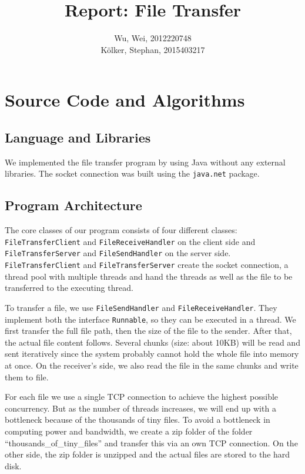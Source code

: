 \documentclass[12pt,a4paper]{article}
\title{Report: File Transfer}
\author{Wu, Wei, 2012220748 \\ Kölker, Stephan, 2015403217}
\begin{document}
\maketitle

\section{Source Code and Algorithms}

\subsection{Language and Libraries}
We implemented the file transfer program by using Java without any external libraries. The socket connection was built using the \lstinline!java.net! package.

\subsection{Program Architecture}
The core classes of our program consists of four different classes: \lstinline!FileTransferClient! and \lstinline!FileReceiveHandler! on the client side and \lstinline!FileTransferServer! and \lstinline!FileSendHandler! on the server side. \lstinline!FileTransferClient! and \lstinline!FileTransferServer! create the socket connection, a thread pool with multiple threads and hand the threads as well as the file to be transferred to the executing thread.

To transfer a file, we use \lstinline!FileSendHandler! and \lstinline!FileReceiveHandler!. They implement both the interface \lstinline!Runnable!, so they can be executed in a thread. We first transfer the full file path, then the size of the file to the sender. After that, the actual file content follows. Several chunks (size: about 10KB) will be read and sent iteratively since the system probably cannot hold the whole file into memory at once. On the receiver's side, we also read the file in the same chunks and write them to file. 

For each file we use a single TCP connection to achieve the highest possible concurrency. But as the number of threads increases, we will end up with a bottleneck because of the thousands of tiny files. To avoid a bottleneck in computing power and bandwidth, we create a zip folder of the folder ``thousands\_of\_tiny\_files'' and transfer this via an own TCP connection. On the other side, the zip folder is unzipped and the actual files are stored to the hard disk.
\end{document}

